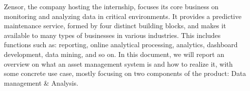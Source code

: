 Zensor, the company hosting the internship, focuses its core business on monitoring and analyzing data in critical environments. It provides a predictive maintenance service, formed by four distinct building blocks, and makes it available to many types of businesses in various industries. 
This includes functions such as: reporting, online analytical processing, analytics, dashboard development, data mining, and so on.
In this document, we will report an overview on what an asset management system is and how to realize it, with some concrete use case, mostly focusing on two components of the product: Data management \& Analysis.

\cleardoublepage